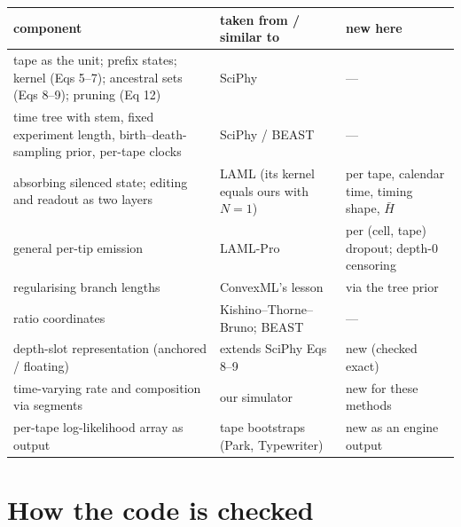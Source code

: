 \documentclass[11pt]{article}
\newcommand{\Hbar}{\bar H}
\begin{document}
\begin{center}\small
\begin{tabular}{@{}p{}p{}p{}@{}}
\toprule
component & taken from / similar to & new here \\
\midrule
tape as the unit; prefix states; kernel (Eqs 5--7); ancestral sets (Eqs 8--9); pruning (Eq 12) & SciPhy & --- \\
time tree with stem, fixed experiment length, birth--death-sampling prior, per-tape clocks & SciPhy / BEAST & --- \\
absorbing silenced state; editing and readout as two layers & LAML (its kernel equals ours with $N=1$) & per tape, calendar time, timing shape, $\Hbar$ \\
general per-tip emission & LAML-Pro & per (cell, tape) dropout; depth-0 censoring \\
regularising branch lengths & ConvexML's lesson & via the tree prior \\
ratio coordinates & Kishino--Thorne--Bruno; BEAST & --- \\
depth-slot representation (anchored / floating) & extends SciPhy Eqs 8--9 & new (checked exact) \\
time-varying rate and composition via segments & our simulator & new for these methods \\
per-tape log-likelihood array as output & tape bootstraps (Park, Typewriter) & new as an engine output \\
\bottomrule
\end{tabular}
\end{center}

\section{How the code is checked}\label{sec:val}
\end{document}
